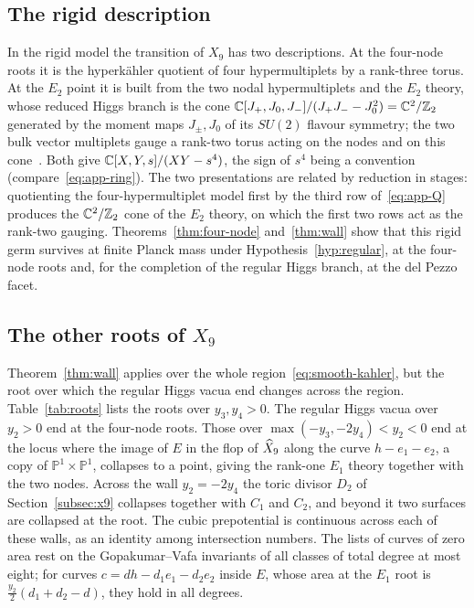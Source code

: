 \subsection{The rigid description}
\label{subsec:rigid}

In the rigid model the transition of $X_9$ has two descriptions. At the four-node
roots it is the hyperk\"ahler quotient of four hypermultiplets by a rank-three torus. At the
$E_2$ point it is built from the two nodal hypermultiplets and the $E_2$ theory, whose reduced
Higgs branch is the cone $\mathbb C[J_+,J_0,J_-]/(J_+J_--J_0^2)=\mathbb C^2/\mathbb Z_2$ generated by the moment maps
$J_\pm,J_0$ of its $SU(2)$ flavour symmetry; the two bulk vector multiplets gauge a rank-two
torus acting on the nodes and on this cone~\cite[eqs.~(2.3), (3.10)]{W26quantum}. Both give
$\mathbb C[X,Y,s]/(XY-s^4)$, the sign of $s^4$ being a convention (compare~\eqref{eq:app-ring}).
The two presentations are related by reduction in stages: quotienting the four-hypermultiplet
model first by the third row of~\eqref{eq:app-Q} produces the $\mathbb C^2/\mathbb Z_2$ cone of the $E_2$
theory, on which the first two rows act as the rank-two gauging.
Theorems~\ref{thm:four-node} and~\ref{thm:wall} show that this rigid germ survives at finite
Planck mass under Hypothesis~\ref{hyp:regular}, at the four-node roots and, for the completion of
the regular Higgs branch, at the del Pezzo facet.

\subsection{The other roots of \texorpdfstring{$X_9$}{X9}}
\label{subsec:other-roots}

Theorem~\ref{thm:wall} applies over the whole region~\eqref{eq:smooth-kahler}, but the root over
which the regular Higgs vacua end changes across the region. Table~\ref{tab:roots} lists the
roots over $y_3,y_4>0$. The regular Higgs vacua over $y_2>0$ end at the four-node roots. Those
over $\max(-y_3,-2y_4)<y_2<0$ end at the locus where the image of $E$ in the flop of $\widehat X_9$
along the curve $h-e_1-e_2$, a copy of $\mathbb P^1\times\mathbb P^1$, collapses to a point, giving the rank-one $E_1$ theory together with the two nodes. Across the wall $y_2=-2y_4$ the toric divisor
$D_2$ of Section~\ref{subsec:x9} collapses together with $C_1$ and $C_2$, and beyond it two surfaces are collapsed at the root. The
cubic prepotential is continuous across each of these walls, as an identity among intersection
numbers. The lists of curves of zero area rest on the Gopakumar--Vafa invariants of all classes
of total degree at most eight; for curves $c=dh-d_1e_1-d_2e_2$ inside $E$, whose area at the
$E_1$ root is $\tfrac{y_2}2(d_1+d_2-d)$, they hold in all degrees.


